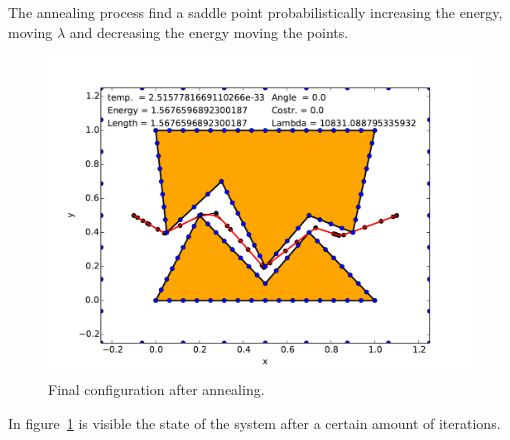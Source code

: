 \documentclass[a4paper]{article}
\begin{document}
The annealing process
find a saddle point probabilistically increasing the energy, moving
$\lambda$ and 
decreasing the energy moving the points.

\begin{figure}[htb]
  \centering
  \includegraphics[width=\textwidth]{img/final.pdf}
  \caption{Final configuration after annealing.}
  \label{fig:final}
\end{figure}
In figure~\ref{fig:final} is visible the state of the system after a
certain amount of iterations.

\newpage
\nocite{*}
{}


\end{document}
